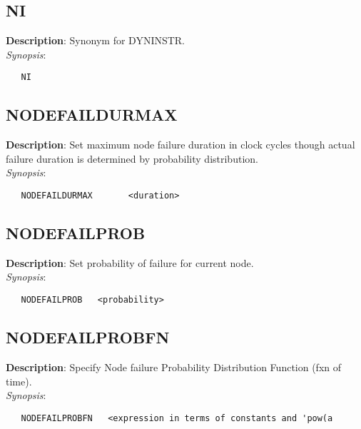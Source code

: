 \subsection{\bf NI}
\label{manpages:NI}
\label{manpages:ni}
\vspace{-0.2in}
{\bf Description}: 	Synonym for DYNINSTR.\\[1.5ex]
{\em Synopsis}:
\vspace{-0.2in}
\scriptsize
\begin{verbatim}
   NI   						
\end{verbatim}
\normalsize
\vspace{-0.2in}


\subsection{\bf NODEFAILDURMAX}
\label{manpages:NODEFAILDURMAX}
\label{manpages:nodefaildurmax}
\vspace{-0.2in}
{\bf Description}: 	Set maximum node failure duration in clock cycles though actual failure duration is determined by probability distribution.\\[1.5ex]
{\em Synopsis}:
\vspace{-0.2in}
\scriptsize
\begin{verbatim}
   NODEFAILDURMAX   	<duration>		
\end{verbatim}
\normalsize
\vspace{-0.2in}


\subsection{\bf NODEFAILPROB}
\label{manpages:NODEFAILPROB}
\label{manpages:nodefailprob}
\vspace{-0.2in}
{\bf Description}: 	Set probability of failure for current node.\\[1.5ex]
{\em Synopsis}:
\vspace{-0.2in}
\scriptsize
\begin{verbatim}
   NODEFAILPROB   <probability>		
\end{verbatim}
\normalsize
\vspace{-0.2in}


\subsection{\bf NODEFAILPROBFN}
\label{manpages:NODEFAILPROBFN}
\label{manpages:nodefailprobfn}
\vspace{-0.2in}
{\bf Description}: 	Specify Node failure Probability Distribution Function (fxn of time).\\[1.5ex]
{\em Synopsis}:
\vspace{-0.2in}
\scriptsize
\begin{verbatim}
   NODEFAILPROBFN   <expression in terms of constants and 'pow(a
\end{verbatim}
\normalsize
\vspace{-0.2in}


